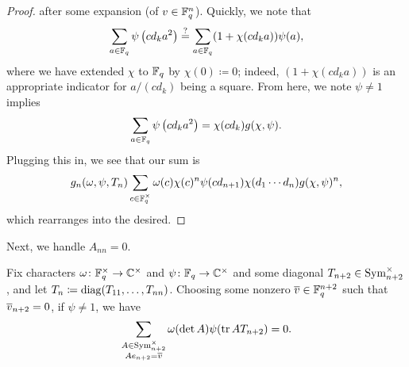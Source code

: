 \begin{proof}
    after some expansion (of $v\in\mathbb F_q^n$). Quickly, we note that
    \[\sum_{a\in\mathbb F_q}\psi\left(cd_ka^2\right)\stackrel?=\sum_{a\in\mathbb F_q}(1+\chi(cd_ka))\psi(a),\]
    where we have extended $\chi$ to $\mathbb F_q$ by $\chi(0)\coloneqq0$; indeed, $(1+\chi(cd_ka))$ is an appropriate indicator for $a/(cd_k)$ being a square. From here, we note $\psi\ne1$ implies
    \[\sum_{a\in\mathbb F_q}\psi\left(cd_ka^2\right)=\chi(cd_k)g(\chi,\psi).\]
    Plugging this in, we see that our sum is
    \[g_n(\omega,\psi,T_n)\sum_{c\in\mathbb F_q^\times}\omega(c)\chi(c)^n\psi(cd_{n+1})\chi(d_1\cdots d_n)g(\chi,\psi)^n,\]
    which rearranges into the desired.
\end{proof}
Next, we handle $A_{nn}=0$.
\begin{lemma} \label{lem:gsum-sym-ind-0}
    Fix characters $\omega\colon\mathbb F_q^\times\to\mathbb C^\times$ and $\psi\colon\mathbb F_q\to\mathbb C^\times$ and some diagonal $T_{n+2}\in\operatorname{Sym}^\times_{n+2}$, and let $T_n\coloneqq\operatorname{diag}(T_{11},\ldots,T_{nn})$. Choosing some nonzero $\overline{v}\in\mathbb F_q^{n+2}$ such that $\overline{v}_{n+2}=0$, if $\psi\ne1$, we have
    \[\sum_{\substack{A\in\operatorname{Sym}_{n+2}^\times\\Ae_{n+2}=\overline{v}}}\omega(\det A)\psi(\operatorname{tr} AT_{n+2})=0.
    \]
\end{lemma}
